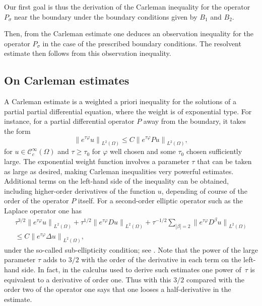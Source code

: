\documentclass[JEP,XML,SOM,Unicode,published]{cedram}
\theoremstyle{plain}
\theoremstyle{definition}
\newcommand{\suff}{sufficiently\xspace}
\newcommand{\Norm}[2]{{\| #1 \|}_{#2}}
\newcommand{\Psig}{P_{\sigma}}
\newcommand{\Con}{\ensuremath{\mathscr C}}
\newcommand{\Cinfc}{\ensuremath{\Con^\infty_c}}
\begin{document}
Our first goal is thus the derivation of the Carleman inequality for
the operator $\Psig$ near the boundary under the boundary conditions
given by $B_1$ and $B_2$.

Then, from the Carleman estimate one deduces an observation inequality
for the operator $\Psig$ in the case of the prescribed boundary
conditions. The resolvent estimate then follows from this observation inequality.

\subsection{On Carleman estimates}
A Carleman estimate is a weighted a priori inequality for the solutions of a partial partial differential equation, where the weight is of exponential type.
For instance, for a partial differential operator $P$ away from the boundary, it takes the form
\begin{equation*}
\Norm{e^{\tau\varphi}u}{L^2(\Omega)}
\leq C \Norm{e^{\tau\varphi} P u}{L^2(\Omega)},
\end{equation*}
for $u \in \Cinfc(\Omega)$ and $\tau\geq\tau_0$ for $\varphi$ well
chosen and some $\tau_0$ chosen \suff large. The exponential weight
function involves a parameter $\tau$ that can be taken as large as
desired, making Carleman inequalities very powerful estimates.
Additional terms on the left-hand side of the inequality can be
obtained, including higher-order derivatives of the function $u$,
depending of course of the order of the operator $P$ itself.
For a second-order elliptic operator such as the Laplace operator one
has
\begin{multline*}
\tau^{3/2}\Norm{e^{\tau\varphi}u}{L^2(\Omega)}
+ \tau^{1/2}\Norm{e^{\tau\varphi} D u}{L^2(\Omega)}
+ \tau^{-1/2}\sum_{|\beta|=2}\Norm{e^{\tau\varphi} D^\beta u}{L^2(\Omega)}\\[
-5pt]
\leq C \Norm{e^{\tau\varphi} \Delta u}{L^2(\Omega)},
\end{multline*}
under the so-called sub-ellipticity condition; see
\cite[Chap.\,3]{JGL-vol1}. Note that the power of the large parameter $\tau$
adds to $3/2$ with the order of the derivative in each term on the
left-hand side. In fact, in the calculus used to derive such estimates
one power of~$\tau$ is equivalent to a derivative of order one. Thus
with this $3/2$ compared with the order two of the operator one says
that one looses a half-derivative in the estimate.
\end{document}
